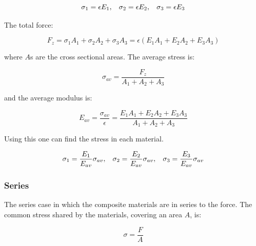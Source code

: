 \documentclass[hidelinks]{article}
\numberwithin{equation}{section}
\begin{document}
    \begin{equation}\label{eq: parallel-youngs-mod-stresses}
        \sigma_1 = \epsilon E_1, \hspace{0.3cm} \sigma_2 = \epsilon E_2,\hspace{0.3cm} 
        \sigma_3 = \epsilon E_3
    \end{equation}

    \noi The total force:

    \begin{equation}\label{eq: parallel-youngs-mod-tot-force}
        F_z = \sigma_1A_1 + \sigma_2A_2 + \sigma_3A_3 = \epsilon(E_1A_1 + E_2A_2 + E_3A_3)
    \end{equation}

    \noi where $A$s are the cross sectional areas. The average stress is:

    \begin{equation}\label{eq: parallel-youngs-mod-av-stress}
    \sigma_{av} = \frac{F_z}{A_1 + A_2 + A_3}
    \end{equation}

    \noi and the average modulus is:

    \begin{equation}\label{eq: parallel-youngs-mod-av-mod}
        E_{av} = \frac{\sigma_{av}}{\epsilon} = \frac{E_1A_1 + 
        E_2A_2 + E_3A_3}{A_1 + A_2 + A_3}
    \end{equation}

    \noindent Using this one can find the stress in each material.

    \begin{equation}\label{eq: parallel-youngs-mod-individual-stresses}
        \sigma_1 = \frac{E_1}{E_{av}}\sigma_{av}, \hspace{0.3cm} 
        \sigma_2 = \frac{E_2}{E_{av}}\sigma_{av}, \hspace{0.3cm} 
        \sigma_3 = \frac{E_3}{E_{av}}\sigma_{av} 
    \end{equation}

    \subsubsection{Series}
    
    The series case in which the composite materials are in series to the force. The 
    common stress shared by the materials, covering an area $A$, is:

    \begin{equation}\label{eq: series-youngs-mod-simple-stress}
        \sigma = \frac{F}{A}
    \end{equation}
\end{document}
